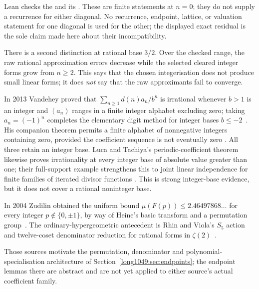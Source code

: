 Lean checks the
 and its
.  These are finite statements at $n=0$; they do not supply a
recurrence for either diagonal.  No recurrence, endpoint, lattice, or
valuation statement for one diagonal is used for the other; the displayed
exact residual is the sole claim made here about their incompatibility.

There is a second distinction at rational base $3/2$.  Over the checked range,
the raw rational approximation errors decrease while the selected cleared
integer forms grow from $n\ge2$.  This says that the chosen integerisation does
not produce small linear forms; it does \emph{not} say that the raw approximants
fail to converge.

In 2013 Vandehey proved that
$\sum_{n\ge1}d(n)a_n/b^n$ is irrational whenever $b>1$ is an integer and
$(a_n)$ ranges in a finite integer alphabet excluding zero; taking
$a_n=(-1)^n$ completes the elementary digit method for integer bases
$b\le-2$~\cite[Thm.~1.2, p.~2]{vandehey2013}.  His companion theorem permits
a finite alphabet of nonnegative integers containing zero, provided the
coefficient sequence is not eventually zero
\cite[Thm.~1.1, p.~2]{vandehey2013}.  All
three retain an integer base.  Luca and Tachiya's periodic-coefficient theorem
likewise proves irrationality at every integer base of absolute value greater
than one; their full-support example strengthens this to joint linear
independence for finite families of iterated divisor functions
\cite[Theorem~A, p.~139; Example~1, p.~140]{lucatachiya2017}.  This is strong
integer-base evidence, but it does not cover a rational noninteger base.

In 2004 Zudilin obtained the uniform bound
$\mu(F(p))\le2.46497868\ldots$ for every integer
$p\notin\{0,\pm1\}$, by way of Heine's basic transform and a permutation
group~\cite[Thm.~1, p.~154; Secs.~4--5, pp.~159--162]{zudilin2004}.
The ordinary-hypergeometric antecedent is Rhin and Viola's $S_5$ action and
twelve-coset denominator reduction for rational forms in
$\zeta(2)$~\cite[Sec.~3, pp.~38--42; Sec.~4, pp.~46--51]{rhinviola1996}.

Those sources motivate the permutation, denominator and polynomial-
specialisation architecture of Section~\ref{long1049:sec:endpoints}; the endpoint
lemmas there are abstract and are not yet applied to either source's actual
coefficient family.

